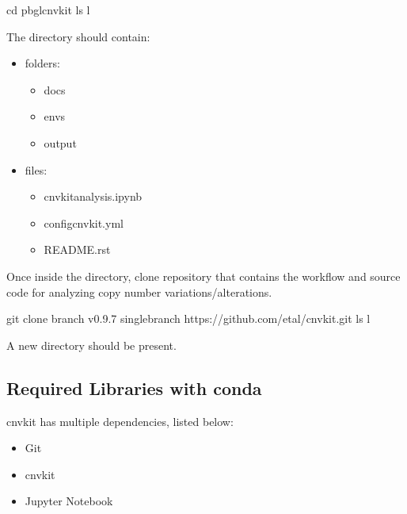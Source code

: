 \documentclass[letterpaper,10pt,english]{sphinxhowto}
\begin{document}
\begin{sphinxVerbatim}[commandchars=\\\{\}]
\PYGZdl{} cd pbgl\PYGZhy{}cnvkit
\PYGZdl{} ls \PYGZhy{}l
\end{sphinxVerbatim}

\sphinxAtStartPar
The  directory should contain:
\begin{itemize}
\item {} 
 folders:
\begin{itemize}
\item {} 
\sphinxAtStartPar
docs

\item {} 
\sphinxAtStartPar
envs

\item {} 
\sphinxAtStartPar
output

\end{itemize}

\item {} 
 files:
\begin{itemize}
\item {} 
\sphinxAtStartPar
cnvkit\sphinxhyphen{}analysis.ipynb

\item {} 
\sphinxAtStartPar
config\sphinxhyphen{}cnvkit.yml

\item {} 
\sphinxAtStartPar
README.rst

\end{itemize}

\end{itemize}

\sphinxAtStartPar
Once inside the  directory, clone  repository that contains the workflow and source code for analyzing copy number variations/alterations.

\begin{sphinxVerbatim}[commandchars=\\\{\}]
\PYGZdl{} git clone \PYGZhy{}\PYGZhy{}branch v0.9.7 \PYGZhy{}\PYGZhy{}single\PYGZhy{}branch https://github.com/etal/cnvkit.git
\PYGZdl{} ls \PYGZhy{}l
\end{sphinxVerbatim}

\sphinxAtStartPar
A new directory  should be present.


\subsection{Required Libraries with conda}
\label{\detokenize{index:required-libraries-with-conda}}
\sphinxAtStartPar
cnvkit has multiple dependencies, listed below:
\begin{itemize}
\item {} 
\sphinxAtStartPar
Git

\item {} 
\sphinxAtStartPar
cnvkit

\item {} 
\sphinxAtStartPar
Jupyter Notebook

\end{itemize}
\end{document}
